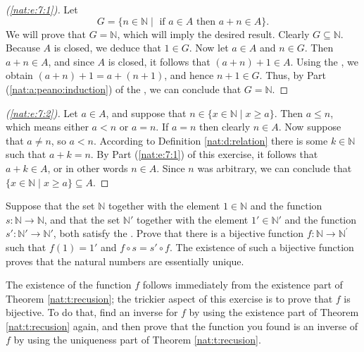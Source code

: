 \begin{proof}[(\ref{nat:e:7:1})]
	Let
	\[
		G = \{ n \in \mathbb{N} \mid \text{ if } a \in A \text{ then } a + n \in A \}.
	\]
	We will prove that $G = \mathbb{N}$, which will imply the desired result. Clearly $G \subseteq \mathbb{N}$. Because $A$ is closed, we deduce that $1 \in G$. Now let $a \in A$ and $n \in G$. Then $a + n \in A$, and since $A$ is closed, it follows that $(a + n) + 1 \in A$. Using the , we obtain $(a + n) + 1 = a + (n + 1)$, and hence $n + 1 \in G$. Thus, by Part (\ref{nat:a:peano:induction}) of the , we can conclude that $G = \mathbb{N}$.
\end{proof}

\begin{proof}[(\ref{nat:e:7:2})]
	Let $a \in A$, and suppose that $n \in \{ x \in \mathbb{N} \mid x \geq a \}$. Then $a \leq n$, which means either $a < n$ or $a = n$. If $a = n$ then clearly $n \in A$. Now suppose that $a \not= n$, so $a < n$. According to Definition \ref{nat:d:relation} there is some $k \in \mathbb{N}$ such that $a + k = n$. By Part (\ref{nat:e:7:1}) of this exercise, it follows that $a + k \in A$, or in other words $n \in A$. Since $n$ was arbitrary, we can conclude that $\{ x \in \mathbb{N} \mid x \geq a \} \subseteq A$.
\end{proof}


\Newpage
\begin{exercise} %
	Suppose that the set $\mathbb{N}$ together with the element $1 \in \mathbb{N}$ and the function $s: \mathbb{N} \to \mathbb{N}$, and that the set $\mathbb{N}'$ together with the element $1' \in \mathbb{N}'$ and the function $s': \mathbb{N}' \to \mathbb{N}'$, both satisfy the . Prove that there is a bijective function $f: \mathbb{N} \to \mathbb{N}^{\prime}$ such that $f(1)=1'$ and $f \circ s=s' \circ f$. The existence of such a bijective function proves that the natural numbers are essentially unique.

	The existence of the function $f$ follows immediately from the existence part of Theorem \ref{nat:t:recusion}; the trickier aspect of this exercise is to prove that $f$ is bijective. To do that, find an inverse for $f$ by using the existence part of Theorem \ref{nat:t:recusion} again, and then prove that the function you found is an inverse of $f$ by using the uniqueness part of Theorem \ref{nat:t:recusion}.
\end{exercise}

